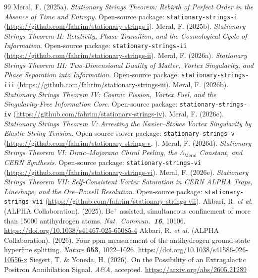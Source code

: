 \documentclass[12pt,a4paper]{article}
\begin{document}
\begin{thebibliography}{99}
     Meral, F. (2025a). \textit{Stationary Strings Theorem: Rebirth of Perfect Order in the Absence of Time and Entropy}. Open-source package: \texttt{stationary-strings-i} (\url{https://github.com/fahrim/stationary-strings-i}).
     Meral, F. (2025b). \textit{Stationary Strings Theorem II: Relativity, Phase Transition, and the Cosmological Cycle of Information}. Open-source package: \texttt{stationary-strings-ii} (\url{https://github.com/fahrim/stationary-strings-ii}).
     Meral, F. (2026a). \textit{Stationary Strings Theorem III: Two-Dimensional Duality of Matter, Vortex Singularity, and Phase Separation into Information}. Open-source package: \texttt{stationary-strings-iii} (\url{https://github.com/fahrim/stationary-strings-iii}).
     Meral, F. (2026b). \textit{Stationary Strings Theorem IV: Cosmic Fission, Vortex Fuel, and the Singularity-Free Information Core}. Open-source package: \texttt{stationary-strings-iv} (\url{https://github.com/fahrim/stationary-strings-iv}).
     Meral, F. (2026c). \textit{Stationary Strings Theorem V: Arresting the Navier--Stokes Vortex Singularity by Elastic String Tension}. Open-source solver package: \texttt{stationary-strings-v} (\url{https://github.com/fahrim/stationary-strings-v}, ).
     Meral, F. (2026d). \textit{Stationary Strings Theorem VI: Dirac--Majorana Chiral Peeling, the $\Lambda_{\mathrm{Meral}}$ Constant, and CERN Synthesis}. Open-source package: \texttt{stationary-strings-vi} (\url{https://github.com/fahrim/stationary-strings-vi}).
     Meral, F. (2026e). \textit{Stationary Strings Theorem VII: Self-Consistent Vortex Saturation in CERN ALPHA Traps, Lineshape, and the Ore--Powell Resolution}. Open-source package: \texttt{stationary-strings-vii} (\url{https://github.com/fahrim/stationary-strings-vii}).
     Akbari, R. \textit{et al.} (ALPHA Collaboration). (2025). Be$^+$ assisted, simultaneous confinement of more than 15000 antihydrogen atoms. \textit{Nat.\ Commun.\ \textbf{16}}, 10106. \url{https://doi.org/10.1038/s41467-025-65085-4}
     Akbari, R. \textit{et al.} (ALPHA Collaboration). (2026). Four ppm measurement of the antihydrogen ground-state hyperfine splitting. \textit{Nature} \textbf{653}, 1022--1026. \url{https://doi.org/10.1038/s41586-026-10556-x}
     Siegert, T. \& Yoneda, H. (2026). On the Possibility of an Extragalactic Positron Annihilation Signal. \textit{A\&A}, accepted. \url{https://arxiv.org/abs/2605.21289}

\end{thebibliography}
\end{document}

